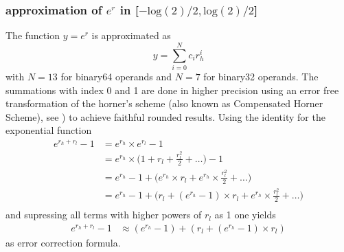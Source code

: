 \documentclass[10pt,a4paper,draft]{article}
\numberwithin{equation}{subsection}
\begin{document}
\subsubsection{approximation of $e^r$ in [$-\text{log}(2)/2, \text{log}(2)/2$]}

    The function $y = e^r$ is approximated as
    \begin{equation}
        y = \sum_{i=0}^{N}c_i r_h^i
    \end{equation}
    with $N=13$ for binary64 operands and $N=7$ for binary32 operands.
    The summations with index 0 and 1 are done in higher precision
    using an error free transformation of the horner's scheme
    (also known as Compensated Horner Scheme), see \cite{Graillat05compensatedhorner}) to achieve
    faithful rounded results.
    Using the identity for the exponential function
    \[
        \begin{aligned}
        e^{r_h+r_l} - 1 &=
            e^{r_h} \times e^{r_l} - 1 \\
                        &=
            e^{r_h} \times \big( 1+ r_l + \frac{r_l^2}{2} + \dots \big) - 1 \\
                        &=
            e^{r_h} -1 + \big( e^{r_h} \times r_l +
                                e^{r_h} \times \frac{r_l^2}{2} +
                                \dots
                         \big) \\
                        &=
            e^{r_h} -1 + \big( r_l + (e^{r_h}-1) \times r_l +
                                e^{r_h} \times \frac{r_l^2}{2} +
                                \dots
                         \big) \\
        \end{aligned}
    \]
    and supressing all terms with higher powers of $r_l$ as 1 one yields
    \begin{equation}
        \begin{aligned}
        e^{r_h+r_l} - 1 & \approx
            (e^{r_h} -1) + (r_l + (e^{r_h}-1) \times r_l)
        \end{aligned}
    \end{equation}
    as error correction formula.
\end{document}

